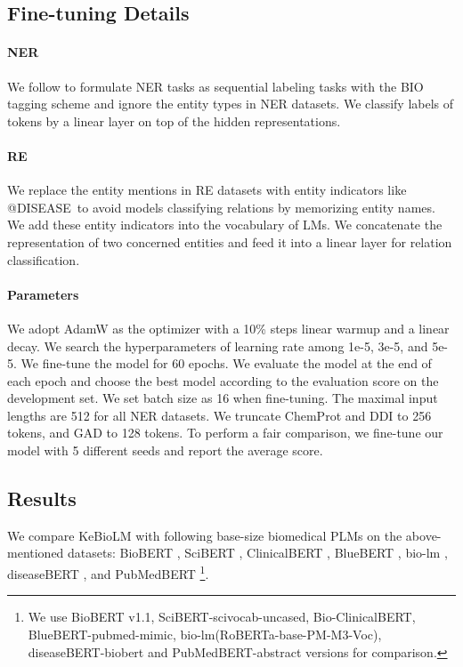 \documentclass[11pt]{article}
\begin{document}
\subsection{Fine-tuning Details}
\paragraph{NER} We follow \citet{gu2020domain} to formulate NER tasks as sequential labeling tasks with the BIO tagging scheme and ignore the entity types in NER datasets.
We classify labels of tokens by a linear layer on top of the hidden representations.

\paragraph{RE} We replace the entity mentions in RE datasets with entity indicators like @DISEASE\ to avoid models classifying relations by memorizing entity names.
We add these entity indicators into the vocabulary of LMs.
We concatenate the representation of two concerned entities and feed it into a linear layer for relation classification.

\paragraph{Parameters} We adopt AdamW as the optimizer with a 10\% steps linear warmup and a linear decay.
We search the hyperparameters of learning rate among 1e-5, 3e-5, and 5e-5.
We fine-tune the model for 60 epochs.
We evaluate the model at the end of each epoch and choose the best model according to the evaluation score on the development set.
We set batch size as 16 when fine-tuning.
The maximal input lengths are 512 for all NER datasets.
We truncate ChemProt and DDI to 256 tokens, and GAD to 128 tokens.
To perform a fair comparison, we fine-tune our model with 5 different seeds and report the average score.

\subsection{Results}
We compare KeBioLM with following base-size biomedical PLMs on the above-mentioned datasets: 
BioBERT \cite{lee2020biobert},
SciBERT \cite{beltagy-etal-2019-scibert}, 
ClinicalBERT \cite{alsentzer-etal-2019-publicly},
BlueBERT \cite{peng-etal-2019-transfer},
bio-lm \cite{lewis-etal-2020-pretrained},
diseaseBERT \cite{he-etal-2020-infusing},
and PubMedBERT \cite{gu2020domain} \footnote{We use BioBERT v1.1, SciBERT-scivocab-uncased, Bio-ClinicalBERT, BlueBERT-pubmed-mimic, bio-lm(RoBERTa-base-PM-M3-Voc), diseaseBERT-biobert and PubMedBERT-abstract versions for comparison.}.
\end{document}
